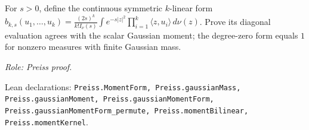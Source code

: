 \begin{definition}
\label{def:moments}





For $s>0$, define the continuous symmetric $k$-linear form $b_{k,s}(u_1,\ldots,u_k)=\frac{(2s)^k}{k! I_\nu(s)}\int e^{-s|z|^2}\prod_{i=1}^k\langle z,u_i\rangle\,d\nu(z)$. Prove its diagonal evaluation agrees with the scalar Gaussian moment; the degree-zero form equals $1$ for nonzero measures with finite Gaussian mass.
\par\emph{Role: Preiss proof.}
\par Lean declarations: \texttt{Preiss.MomentForm, Preiss.gaussianMass, Preiss.gaussianMoment, Preiss.gaussianMomentForm, Preiss.gaussianMomentForm\_permute, Preiss.momentBilinear, Preiss.momentKernel}.
\end{definition}

